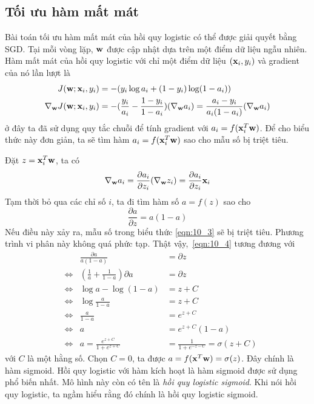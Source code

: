 \subsection{Tối ưu hàm mất mát}
Bài toán tối ưu hàm mất mát của hồi quy logistic có thể được giải quyết bằng
SGD. Tại mỗi vòng lặp, $\mathbf{w}$ được cập nhật dựa trên một điểm dữ liệu ngẫu
nhiên. Hàm mất mát của hồi quy logistic với chỉ một điểm dữ liệu $(\mathbf{x}_i, y_i)$
và gradient của nó lần lượt là
\begin{align}
J(\mathbf{w}; \mathbf{x}_i, y_i) &= -(y_i \log a_i + (1-y_i) \log (1 - a_i)) \\
\label{eqn:10_3}
\nabla_{\mathbf{w}}J(\mathbf{w}; \mathbf{x}_i, y_i)
&= -(\frac{y_i}{a_i} - \frac{1- y_i}{1 - a_i} ) (\nabla_{\mathbf{w}}a_i)
= \frac{a_i - y_i}{a_i(1 - a_i)} (\nabla_{\mathbf{w}}a_i)
\end{align}
ở đây ta đã sử dụng quy tắc chuỗi để tính gradient với $a_i = f(\mathbf{x}_i^T\mathbf{w})$. Để
cho biểu thức này đơn giản, ta sẽ tìm hàm
$a_i = f(\mathbf{x}_i^T\mathbf{w})$ sao cho mẫu số bị triệt tiêu.

Đặt $z = \mathbf{x}_i^T\mathbf{w}$, ta có
\begin{equation}
\label{eqn:10_4a}
\nabla_{\mathbf{w}}a_i
= \frac{\partial a_i}{\partial z_i} (\nabla_{\mathbf{w}}z_i)= \frac{\partial a_i}{\partial
z_i} \mathbf{x}_i
\end{equation}
Tạm thời bỏ qua các chỉ số $i$, ta đi tìm hàm số $a = f(z)$ sao cho
\begin{equation}
\label{eqn:10_4}
\frac{\partial a}{\partial z} = a(1 - a)
\end{equation}
Nếu điều này xảy ra, mẫu số trong biểu thức \eqref{eqn:10_3} sẽ bị triệt tiêu. Phương trình vi phân này không quá phức tạp.
Thật vậy,~\eqref{eqn:10_4} tương đương với
\begin{align*}
&                & \frac{\partial a}{a(1-a)}                 &=  \partial z \\
&\Leftrightarrow & \left(\frac{1}{a} + \frac{1}{1 - a}\right)\partial a &=  \partial z\\
&\Leftrightarrow  &\log a - \log(1 - a)                      &=  z + C \\
&\Leftrightarrow  &\log \frac{a}{1 - a}                      &=  z +C\\
&\Leftrightarrow  &\frac{a}{1 - a}                           &=  e^{z+C} \\
&\Leftrightarrow  &a                                         &=  e^{z+C} (1 - a) \\
&\Leftrightarrow  &a = \frac{e^{z+C}}{1 +e^{z+C}}                    &=  \frac{1}{1 + e^{-z-C}} = \sigma(z+C)
\end{align*}
với $C$ là một hằng số. Chọn $C = 0$, ta được $a = f(\mathbf{x}^T\mathbf{w}) =
\sigma(z)$. Đây chính là hàm sigmoid.
Hồi quy logistic với hàm kích hoạt là hàm sigmoid được sử dụng phổ biến nhất.
Mô hình này còn có tên là \textit{hồi quy logistic sigmoid}. Khi nói hồi quy logistic, ta ngầm hiểu rằng đó chính là hồi quy logistic sigmoid.


